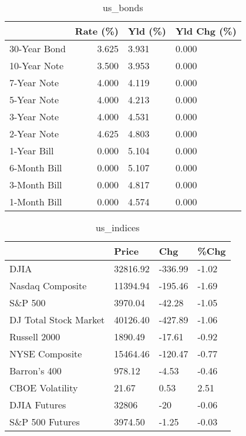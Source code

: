 \documentclass{article}%
\begin{document}
%


\begin{table}[htbp]%
\caption{us\_bonds}%
\centering%
\begin{adjustbox}{width=1\textwidth}%
\begin{tabular}{lrll}
\toprule
             &  Rate (\%) & Yld (\%) & Yld Chg (\%) \\
\midrule
30-Year Bond &     3.625 &   3.931 &       0.000 \\
10-Year Note &     3.500 &   3.953 &       0.000 \\
 7-Year Note &     4.000 &   4.119 &       0.000 \\
 5-Year Note &     4.000 &   4.213 &       0.000 \\
 3-Year Note &     4.000 &   4.531 &       0.000 \\
 2-Year Note &     4.625 &   4.803 &       0.000 \\
 1-Year Bill &     0.000 &   5.104 &       0.000 \\
6-Month Bill &     0.000 &   5.107 &       0.000 \\
3-Month Bill &     0.000 &   4.817 &       0.000 \\
1-Month Bill &     0.000 &   4.574 &       0.000 \\
\bottomrule
\end{tabular}
%
\end{adjustbox}%
\end{table}

%


\begin{table}[htbp]%
\caption{us\_indices}%
\centering%
\begin{adjustbox}{width=1\textwidth}%
\begin{tabular}{llll}
\toprule
                      &    Price &     Chg &  \%Chg \\
\midrule
                 DJIA & 32816.92 & -336.99 & -1.02 \\
     Nasdaq Composite & 11394.94 & -195.46 & -1.69 \\
              S\&P 500 &  3970.04 &  -42.28 & -1.05 \\
DJ Total Stock Market & 40126.40 & -427.89 & -1.06 \\
         Russell 2000 &  1890.49 &  -17.61 & -0.92 \\
       NYSE Composite & 15464.46 & -120.47 & -0.77 \\
         Barron's 400 &   978.12 &   -4.53 & -0.46 \\
      CBOE Volatility &    21.67 &    0.53 &  2.51 \\
         DJIA Futures &    32806 &     -20 & -0.06 \\
      S\&P 500 Futures &  3974.50 &   -1.25 & -0.03 \\
\bottomrule
\end{tabular}
%
\end{adjustbox}%
\end{table}
\end{document}
